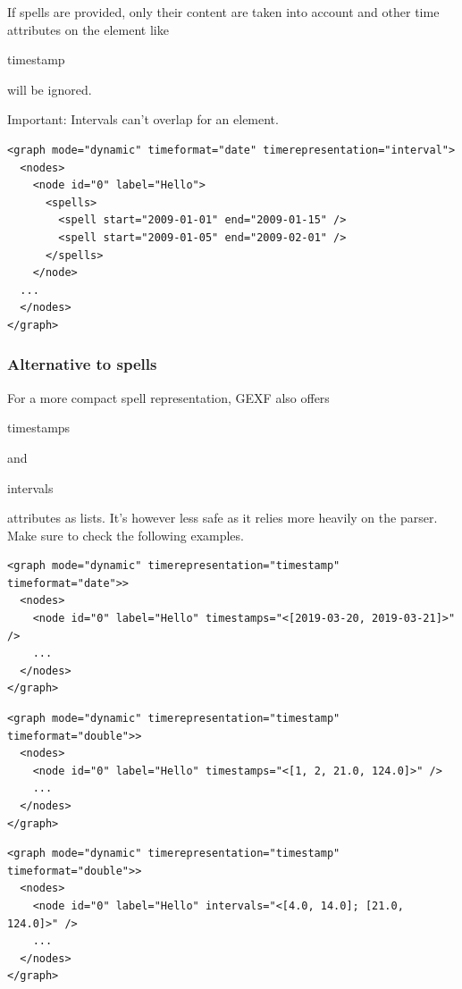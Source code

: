 \documentclass[a4paper,10pt]{article}
\begin{document}
If spells are provided, only their content are taken into account and other time attributes on the element like \begin{footnotesize}timestamp\end{footnotesize} will be ignored.

Important: Intervals can't overlap for an element.

\lstset{ style=gexf }
\begin{lstlisting}[caption={Overlapping intervals (not allowed)}]
<graph mode="dynamic" timeformat="date" timerepresentation="interval">
  <nodes>
    <node id="0" label="Hello">
      <spells>
        <spell start="2009-01-01" end="2009-01-15" />
        <spell start="2009-01-05" end="2009-02-01" />
      </spells>
    </node>
  ...
  </nodes>
</graph>
\end{lstlisting}

\subsubsection{Alternative to spells}

For a more compact spell representation, GEXF also offers \begin{footnotesize}timestamps\end{footnotesize} and \begin{footnotesize}intervals\end{footnotesize} attributes as lists. It's however less safe as it relies more heavily on the parser. Make sure to check the following examples.

\lstset{ style=gexf }
\begin{lstlisting}[caption={Timestamp list (Date)}]
<graph mode="dynamic" timerepresentation="timestamp" timeformat="date">>
  <nodes>
    <node id="0" label="Hello" timestamps="<[2019-03-20, 2019-03-21]>" />
    ...
  </nodes>
</graph>
\end{lstlisting}

\lstset{ style=gexf }
\begin{lstlisting}[caption={Timestamp list (Double)}]
<graph mode="dynamic" timerepresentation="timestamp" timeformat="double">>
  <nodes>
    <node id="0" label="Hello" timestamps="<[1, 2, 21.0, 124.0]>" />
    ...
  </nodes>
</graph>
\end{lstlisting}

\lstset{ style=gexf }
\begin{lstlisting}[caption={Interval list (Double)}]
<graph mode="dynamic" timerepresentation="timestamp" timeformat="double">>
  <nodes>
    <node id="0" label="Hello" intervals="<[4.0, 14.0]; [21.0, 124.0]>" />
    ...
  </nodes>
</graph>
\end{lstlisting}
\end{document}
